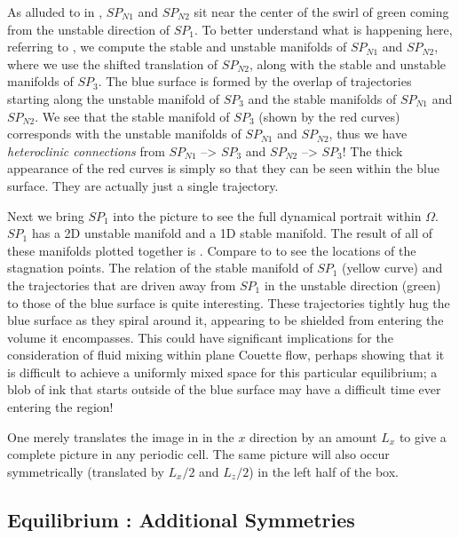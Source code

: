 \documentclass[letter,10pt,openany]{article}
\begin{document}
 As alluded to in , $SP_{N1}$ and $SP_{N2}$ sit near the center of the swirl of green coming from the unstable direction of $SP_1$. To better understand what is happening here, referring to , we compute the  stable and unstable manifolds of $SP_{N1}$ and $SP_{N2}$, where we use the shifted translation of $SP_{N2}$, along with the stable and unstable manifolds of $SP_3$. The blue surface is formed by the overlap of trajectories starting along the unstable manifold of $SP_3$ and the stable manifolds of $SP_{N1}$ and $SP_{N2}$.  We see that the stable manifold of $SP_3$ (shown by the red curves) corresponds with the unstable manifolds of $SP_{N1}$ and $SP_{N2}$, thus we have \textit{heteroclinic connections} from $SP_{N1}$ --> $SP_3$ and $SP_{N2}$ --> $SP_3$!
 The thick appearance of the red curves
 is simply so that they can be seen within the blue surface. They are actually just a single trajectory.
 
 Next we bring $SP_1$ into the picture to see the full dynamical portrait within $\Omega$. $SP_1$ has a 2D unstable manifold
 and a 1D stable manifold. The result of all of these manifolds
 plotted together is . Compare to  to see the locations of the stagnation points. The relation of the
 stable manifold of $SP_1$ (yellow curve) and the trajectories that are driven away from $SP_1$ in the unstable direction (green)
 to those of the blue surface is quite interesting. These trajectories
 tightly hug the blue surface as they spiral around it, appearing to be shielded from entering the volume it encompasses. This could have significant implications for the consideration of fluid mixing within plane Couette flow, perhaps showing that it is difficult to achieve a uniformly mixed space for this particular equilibrium; a blob of ink that starts outside of the blue surface may have a difficult time ever entering the region!
 
 One merely translates the image in  in the
 $x$ direction by an amount $L_{x}$ to give a complete picture in
 any periodic cell. The same picture will also occur symmetrically
 (translated by $L_{x}/2$ and $L_{z}/2$) in the left half of the
 box.
  
 





   \subsection{Equilibrium \tEQeight: Additional Symmetries}
   \label{sect:EQ8}
\end{document}
